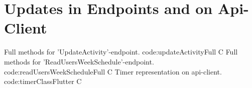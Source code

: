\chapter{Updates in Endpoints and on Api-Client}
        {Full methods for 'UpdateActivity'-endpoint.} %
        {code:updateActivityFull} %
        {C} %
\newpage
{} %
        {Full methods for 'ReadUsersWeekSchedule'-endpoint.} %
        {code:readUsersWeekScheduleFull} %
        {C} %
\newpage
{} %
        {Timer representation on api-client.} %
        {code:timerClassFlutter} %
        {C} %